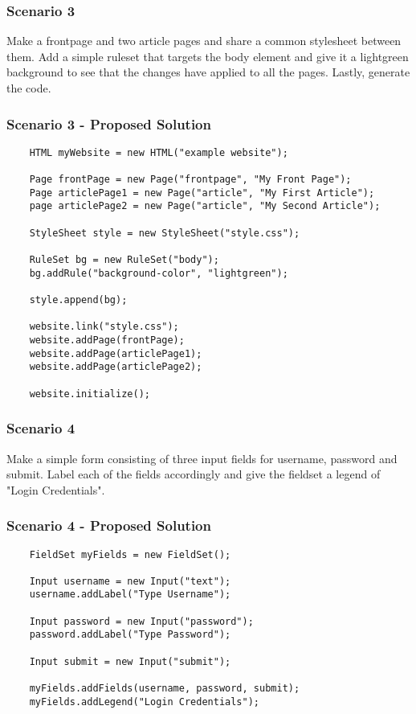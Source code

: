 \documentclass[12pt]{article}
\begin{document}
\subsubsection{Scenario 3}
Make a frontpage and two article pages and share a common stylesheet between them. Add a simple ruleset that targets the body element and give it a lightgreen background to see that the changes have applied to all the pages. Lastly, generate the code.

\subsubsection{Scenario 3 - Proposed Solution}

\begin{lstlisting}
    HTML myWebsite = new HTML("example website");
    
    Page frontPage = new Page("frontpage", "My Front Page");
    Page articlePage1 = new Page("article", "My First Article");
    page articlePage2 = new Page("article", "My Second Article");

    StyleSheet style = new StyleSheet("style.css");

    RuleSet bg = new RuleSet("body");
    bg.addRule("background-color", "lightgreen");

    style.append(bg);

    website.link("style.css");
    website.addPage(frontPage);
    website.addPage(articlePage1);
    website.addPage(articlePage2);

    website.initialize();
\end{lstlisting}

\subsubsection{Scenario 4}
Make a simple form consisting of three input fields for username, password and submit. Label each of the fields accordingly and give the fieldset a legend of "Login Credentials".

\subsubsection{Scenario 4 - Proposed Solution}

\begin{lstlisting}
    FieldSet myFields = new FieldSet();

    Input username = new Input("text");
    username.addLabel("Type Username");
    
    Input password = new Input("password");
    password.addLabel("Type Password");
    
    Input submit = new Input("submit");

    myFields.addFields(username, password, submit);
    myFields.addLegend("Login Credentials");
\end{lstlisting}
\end{document}
